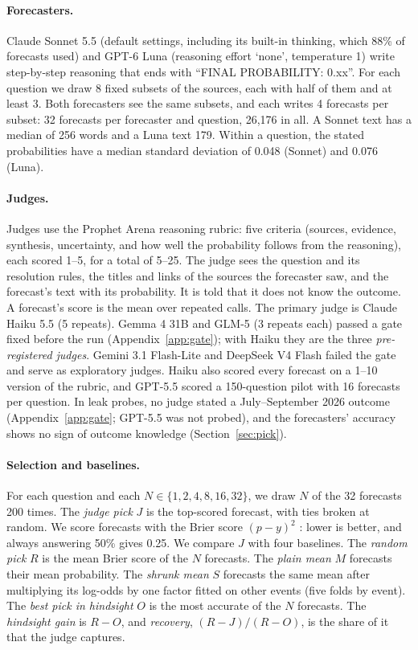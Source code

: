 \documentclass[letterpaper]{article} %
\begin{document}
\paragraph{Forecasters.} Claude Sonnet 5.5 (default settings, including its built-in thinking, which 88\% of forecasts used) and GPT-6 Luna (reasoning effort `none', temperature 1) write step-by-step reasoning that ends with ``FINAL PROBABILITY: 0.xx''. For each question we draw 8 fixed subsets of the sources, each with half of them and at least 3. Both forecasters see the same subsets, and each writes 4 forecasts per subset: 32 forecasts per forecaster and question, 26,176 in all. A Sonnet text has a median of 256 words and a Luna text 179. Within a question, the stated probabilities have a median standard deviation of 0.048 (Sonnet) and 0.076 (Luna).

\paragraph{Judges.} Judges use the Prophet Arena reasoning rubric: five criteria (sources, evidence, synthesis, uncertainty, and how well the probability follows from the reasoning), each scored 1--5, for a total of 5--25. The judge sees the question and its resolution rules, the titles and links of the sources the forecaster saw, and the forecast's text with its probability. It is told that it does not know the outcome. A forecast's score is the mean over repeated calls. The primary judge is Claude Haiku 5.5 (5 repeats). Gemma 4 31B and GLM-5 (3 repeats each) passed a gate fixed before the run (Appendix~\ref{app:gate}); with Haiku they are the three \emph{pre-registered judges}. Gemini 3.1 Flash-Lite and DeepSeek V4 Flash failed the gate and serve as exploratory judges. Haiku also scored every forecast on a 1--10 version of the rubric, and GPT-5.5 scored a 150-question pilot with 16 forecasts per question. In leak probes, no judge stated a July--September 2026 outcome (Appendix~\ref{app:gate}; GPT-5.5 was not probed), and the forecasters' accuracy shows no sign of outcome knowledge (Section~\ref{sec:pick}).

\paragraph{Selection and baselines.} For each question and each $N \in \{1, 2, 4, 8, 16, 32\}$, we draw $N$ of the 32 forecasts 200 times. The \emph{judge pick} $J$ is the top-scored forecast, with ties broken at random. We score forecasts with the Brier score $(p - y)^2$ \citep{brier1950verification}: lower is better, and always answering 50\% gives 0.25. We compare $J$ with four baselines. The \emph{random pick} $R$ is the mean Brier score of the $N$ forecasts. The \emph{plain mean} $M$ forecasts their mean probability. The \emph{shrunk mean} $S$ forecasts the same mean after multiplying its log-odds by one factor fitted on other events (five folds by event). The \emph{best pick in hindsight} $O$ is the most accurate of the $N$ forecasts. The \emph{hindsight gain} is $R - O$, and \emph{recovery}, $(R - J)/(R - O)$, is the share of it that the judge captures.
\end{document}
